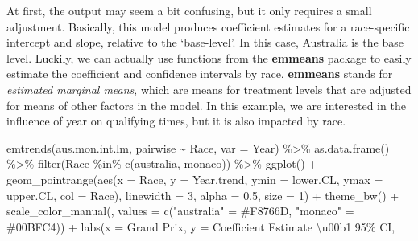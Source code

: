 \documentclass[
]{book}
\newenvironment{Shaded}{\begin{snugshade}}{\end{snugshade}}
\newcommand{\AttributeTok}[1]{\textcolor[rgb]{0.77,0.63,0.00}{#1}}
\newcommand{\DecValTok}[1]{\textcolor[rgb]{0.00,0.00,0.81}{#1}}
\newcommand{\FloatTok}[1]{\textcolor[rgb]{0.00,0.00,0.81}{#1}}
\newcommand{\FunctionTok}[1]{\textcolor[rgb]{0.00,0.00,0.00}{#1}}
\newcommand{\NormalTok}[1]{#1}
\newcommand{\OtherTok}[1]{\textcolor[rgb]{0.56,0.35,0.01}{#1}}
\newcommand{\SpecialCharTok}[1]{\textcolor[rgb]{0.00,0.00,0.00}{#1}}
\newcommand{\StringTok}[1]{\textcolor[rgb]{0.31,0.60,0.02}{#1}}
\begin{document}
At first, the output may seem a bit confusing, but it only requires a small adjustment. Basically, this model produces coefficient estimates for a race-specific intercept and slope, relative to the `base-level'. In this case, Australia is the base level. Luckily, we can actually use functions from the \textbf{emmeans} package to easily estimate the coefficient and confidence intervals by race. \textbf{emmeans} stands for \emph{estimated marginal means}, which are means for treatment levels that are adjusted for means of other factors in the model. In this example, we are interested in the influence of year on qualifying times, but it is also impacted by race.

\begin{Shaded}
\begin{Highlighting}[]
\FunctionTok{emtrends}\NormalTok{(aus.mon.int.lm, pairwise }\SpecialCharTok{\textasciitilde{}}\NormalTok{ Race, }\AttributeTok{var =} \StringTok{\textquotesingle{}Year\textquotesingle{}}\NormalTok{) }\SpecialCharTok{\%\textgreater{}\%}
  \FunctionTok{as.data.frame}\NormalTok{() }\SpecialCharTok{\%\textgreater{}\%}
  \FunctionTok{filter}\NormalTok{(Race }\SpecialCharTok{\%in\%} \FunctionTok{c}\NormalTok{(}\StringTok{\textquotesingle{}australia\textquotesingle{}}\NormalTok{, }\StringTok{\textquotesingle{}monaco\textquotesingle{}}\NormalTok{)) }\SpecialCharTok{\%\textgreater{}\%}
  \FunctionTok{ggplot}\NormalTok{() }\SpecialCharTok{+}
  \FunctionTok{geom\_pointrange}\NormalTok{(}\FunctionTok{aes}\NormalTok{(}\AttributeTok{x =}\NormalTok{ Race, }\AttributeTok{y =}\NormalTok{ Year.trend, }\AttributeTok{ymin =}\NormalTok{ lower.CL, }\AttributeTok{ymax =}\NormalTok{ upper.CL, }\AttributeTok{col =}\NormalTok{ Race), }
                  \AttributeTok{linewidth =} \DecValTok{3}\NormalTok{, }\AttributeTok{alpha =} \FloatTok{0.5}\NormalTok{, }\AttributeTok{size =} \DecValTok{1}\NormalTok{) }\SpecialCharTok{+}
  \FunctionTok{theme\_bw}\NormalTok{() }\SpecialCharTok{+}
  \FunctionTok{scale\_color\_manual}\NormalTok{(}\StringTok{\textquotesingle{}\textquotesingle{}}\NormalTok{, }\AttributeTok{values =} \FunctionTok{c}\NormalTok{(}\StringTok{"australia"} \OtherTok{=} \StringTok{\textquotesingle{}\#F8766D\textquotesingle{}}\NormalTok{, }\StringTok{"monaco"} \OtherTok{=} \StringTok{\textquotesingle{}\#00BFC4\textquotesingle{}}\NormalTok{)) }\SpecialCharTok{+} 
  \FunctionTok{labs}\NormalTok{(}\AttributeTok{x =} \StringTok{\textquotesingle{}Grand Prix\textquotesingle{}}\NormalTok{, }\AttributeTok{y =} \StringTok{\textquotesingle{}Coefficient Estimate \textbackslash{}u00b1 95\% CI\textquotesingle{}}\NormalTok{,}

\end{Highlighting}
\end{Shaded}
\end{document}
